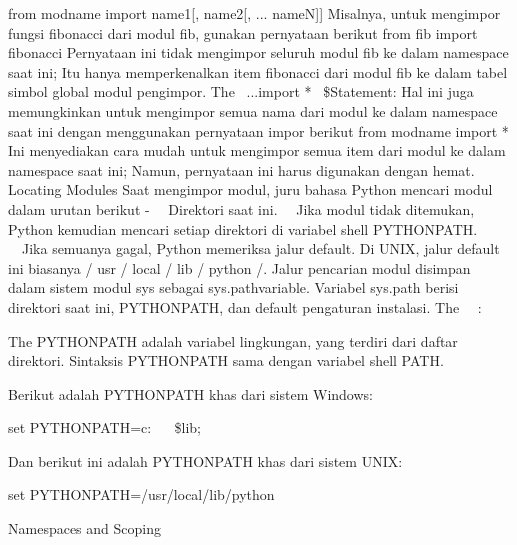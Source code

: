  \hspace*{0.5in} from modname import name1[, name2[, ... nameN]] 
Misalnya, untuk mengimpor fungsi fibonacci dari modul fib, gunakan pernyataan berikut 
 \hspace*{0.5in} from fib import fibonacci 
Pernyataan ini tidak mengimpor seluruh modul fib ke dalam namespace saat ini; Itu hanya memperkenalkan item fibonacci dari modul fib ke dalam tabel simbol global modul pengimpor.  
The \  \from...import * \  \$Statement: 
Hal ini juga memungkinkan untuk mengimpor semua nama dari modul ke dalam namespace saat ini dengan menggunakan pernyataan impor berikut 
 \hspace*{0.5in} from modname import * 
Ini menyediakan cara mudah untuk mengimpor semua item dari modul ke dalam namespace saat ini; Namun, pernyataan ini harus digunakan dengan hemat.
Locating Modules
Saat mengimpor modul, juru bahasa Python mencari modul dalam urutan berikut - 
 \hspace*{0.5in}  \ \bullet \ Direktori saat ini. 
 \hspace*{0.5in}  \ \bullet \ Jika modul tidak ditemukan, Python kemudian mencari setiap direktori di variabel shell  \hspace*{0.5in} PYTHONPATH. 
 \hspace*{0.5in}  \ \bullet \ Jika semuanya gagal, Python memeriksa jalur default. Di UNIX, jalur default ini  \hspace*{0.5in} biasanya / usr / local / lib / python /. 
Jalur pencarian modul disimpan dalam sistem modul sys sebagai sys.pathvariable. Variabel sys.path berisi direktori saat ini, PYTHONPATH, dan default pengaturan instalasi.
The \  \PYTHONPATH \  \Variable: \par
\noindent 
The PYTHONPATH adalah variabel lingkungan, yang terdiri dari daftar direktori. Sintaksis PYTHONPATH sama dengan variabel shell PATH. \par
\noindent 
Berikut adalah PYTHONPATH khas dari sistem Windows: \par
\noindent 
 \hspace*{0.5in} set PYTHONPATH=c: \  \setminus  {} \  \setminus  \$lib; \par
\noindent 
Dan berikut ini adalah PYTHONPATH khas dari sistem UNIX: \par
\noindent 
 \hspace*{0.5in} set PYTHONPATH=/usr/local/lib/python \par
\vspace{12pt}
\noindent 
Namespaces and Scoping \par

